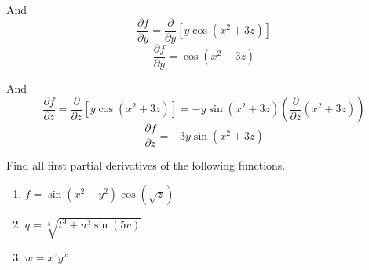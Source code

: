 And
$$\frac{\partial f}{\partial y} = \frac{\partial}{\partial y} \left[ y\cos{ 
\left(x^2 + 3z \right)} \right]$$
$$\frac{\partial f}{\partial y} = \cos{ \left(x^2 + 3z \right)}$$

And
$$\frac{\partial f}{\partial z} = \frac{\partial}{\partial z} \left[ y \cos{ 
\left(x^2 + 3z \right)} \right] = -y\sin{ \left(x^2 + 3z \right)} \left( \frac{
\partial}{\partial z} \left( x^2 + 3z \right) \right)$$
$$\frac{\partial f}{\partial z} = -3y \sin{ \left(x^2 + 3z \right)}$$

\begin{Exercise}[title = {Partial Derivatives with 3 or More Variables}, 
label = three]
Find all first partial derivatives of the following functions.
\begin{enumerate}
\item $f = \sin{\left( x^2 - y^2 \right)} \cos{\left( \sqrt{z} \right)}$
\item $q = \sqrt[3]{t^3 + u^3\sin{\left(5v \right)}}$
\item $w = x^z y^x$
\end{enumerate}
\vspace{100mm}
\end{Exercise}

